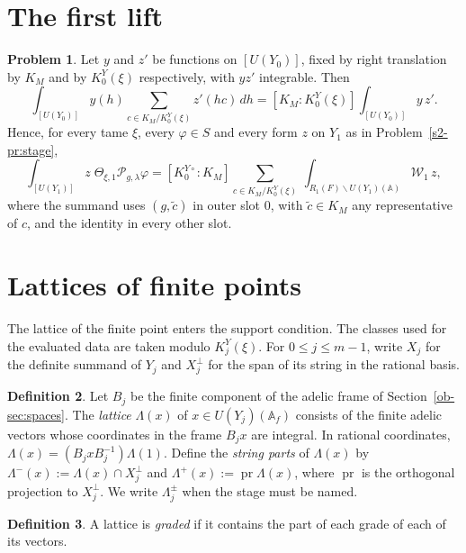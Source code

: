 \documentclass[reqno]{amsart}
\theoremstyle{definition}
\newtheorem{problem}{Problem}[section]
\newtheorem{definition}[problem]{Definition}
\theoremstyle{plain}
\theoremstyle{remark}
\newcommand{\A}{\mathbb{A}}
\newcommand{\Af}{\mathbb{A}_f}
\newcommand{\Pc}{\mathcal{P}}
\newcommand{\Wc}{\mathcal{W}}
\newcommand{\pr}{\operatorname{pr}}
\newcommand{\KYo}[1]{K^{Y\circ}_{#1}}
\newcommand{\KY}[1]{K^{Y}_{#1}(\xi)}
\begin{document}
\section{The first lift}\label{sec:first}

\begin{problem}\label{pr:base}
Let \(y\) and \(z'\) be functions on \([U(Y_0)]\), fixed by right translation by \(K_M\) and by \(\KY0\) respectively, with \(y z'\) integrable.  Then
\[
  \int_{[U(Y_0)]} y(h)\sum_{c\in K_M/\KY0} z'(hc)\,dh=[K_M:\KY0]\int_{[U(Y_0)]}y\,z' .
\]
Hence, for every tame \(\xi\), every \(\varphi\in S\) and every form \(z\) on \(Y_1\) as in Problem~\ref{s2-pr:stage},
\[
  \int_{[U(Y_1)]} z\;\Theta_{\xi,1}\Pc_{g,\lambda}\varphi=[\KYo0:K_M]\sum_{c\in K_M/\KY0}\ \int_{R_1(F)\backslash U(Y_1)(\A)}\Wc_1\,z ,
\]
where the summand uses \((g,\tilde c)\) in outer slot \(0\), with \(\tilde c\in K_M\) any representative of \(c\), and the identity in every other slot.
\end{problem}


\section{Lattices of finite points}\label{sec:lattices}

The lattice of the finite point enters the support condition.  The classes used for the evaluated data are taken modulo \(\KY j\).  For \(0\le j\le m-1\), write \(X_j\) for the definite summand of \(Y_j\) and \(X_j^\perp\) for the span of its string in the rational basis.

\begin{definition}\label{def:lattices}
Let \(B_j\) be the finite component of the adelic frame of Section~\ref{ob-sec:spaces}.  The \emph{lattice} \(\Lambda(x)\) of \(x\in U(Y_j)(\Af)\) consists of the finite adelic vectors whose coordinates in the frame \(B_jx\) are integral.  In rational coordinates, \(\Lambda(x)=(B_jxB_j^{-1})\Lambda(1)\).  Define the \emph{string parts} of \(\Lambda(x)\) by \(\Lambda^-(x):=\Lambda(x)\cap X_j^\perp\) and \(\Lambda^+(x):=\pr\Lambda(x)\), where \(\pr\) is the orthogonal projection to \(X_j^\perp\).  We write \(\Lambda^\pm_j\) when the stage must be named.
\end{definition}

\begin{definition}\label{def:graded}
A lattice is \emph{graded} if it contains the part of each grade of each of its vectors.
\end{definition}
\end{document}
